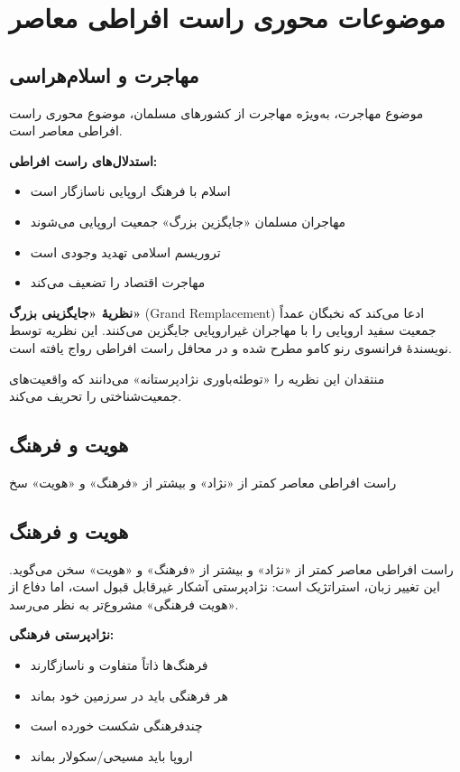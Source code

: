 \section{موضوعات محوری راست افراطی معاصر}

\subsection{مهاجرت و اسلام‌هراسی}


موضوع مهاجرت، به‌ویژه مهاجرت از کشورهای مسلمان، موضوع محوری راست افراطی معاصر است.

\textbf{استدلال‌های راست افراطی:}
\begin{itemize}
    \item اسلام با فرهنگ اروپایی ناسازگار است
    \item مهاجران مسلمان «جایگزین بزرگ» جمعیت اروپایی می‌شوند
    \item تروریسم اسلامی تهدید وجودی است
    \item مهاجرت اقتصاد را تضعیف می‌کند
\end{itemize}

\textbf{نظریهٔ «جایگزینی بزرگ»} (Grand Remplacement) ادعا می‌کند که نخبگان عمداً جمعیت سفید اروپایی را با مهاجران غیراروپایی جایگزین می‌کنند. این نظریه توسط نویسندهٔ فرانسوی رنو کامو مطرح شده و در محافل راست افراطی رواج یافته است.

منتقدان این نظریه را «توطئه‌باوری نژادپرستانه» می‌دانند که واقعیت‌های جمعیت‌شناختی را تحریف می‌کند.


\subsection{هویت و فرهنگ}


راست افراطی معاصر کمتر از «نژاد» و بیشتر از «فرهنگ» و «هویت» سخ

\subsection{هویت و فرهنگ}


راست افراطی معاصر کمتر از «نژاد» و بیشتر از «فرهنگ» و «هویت» سخن می‌گوید. این تغییر زبان، استراتژیک است: نژادپرستی آشکار غیرقابل قبول است، اما دفاع از «هویت فرهنگی» مشروع‌تر به نظر می‌رسد.

\textbf{نژادپرستی فرهنگی:}
\begin{itemize}
    \item فرهنگ‌ها ذاتاً متفاوت و ناسازگارند
    \item هر فرهنگی باید در سرزمین خود بماند
    \item چندفرهنگی شکست خورده است
    \item اروپا باید مسیحی/سکولار بماند
\end{itemize}

